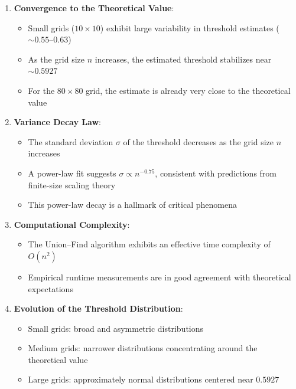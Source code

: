 \documentclass[11pt]{article}
\providecommand{\tightlist}{%
      \setlength{\itemsep}{0pt}\setlength{\parskip}{0pt}}
\begin{document}
\begin{enumerate}
\def\labelenumi{\arabic{enumi}.}
\item
  \textbf{Convergence to the Theoretical Value}:

  \begin{itemize}
  \tightlist
  \item
    Small grids (\(10 \times 10\)) exhibit large variability in
    threshold estimates (\(\sim 0.55\text{--}0.63\))
  \item
    As the grid size \(n\) increases, the estimated threshold stabilizes
    near \(\sim 0.5927\)
  \item
    For the \(80 \times 80\) grid, the estimate is already very close to
    the theoretical value
  \end{itemize}
\item
  \textbf{Variance Decay Law}:

  \begin{itemize}
  \tightlist
  \item
    The standard deviation \(\sigma\) of the threshold decreases as the
    grid size \(n\) increases
  \item
    A power-law fit suggests \(\sigma \propto n^{-0.75}\), consistent
    with predictions from finite-size scaling theory
  \item
    This power-law decay is a hallmark of critical phenomena
  \end{itemize}
\item
  \textbf{Computational Complexity}:

  \begin{itemize}
  \tightlist
  \item
    The Union--Find algorithm exhibits an effective time complexity of
    \(O(n^{2})\)
  \item
    Empirical runtime measurements are in good agreement with
    theoretical expectations
  \end{itemize}
\item
  \textbf{Evolution of the Threshold Distribution}:

  \begin{itemize}
  \tightlist
  \item
    Small grids: broad and asymmetric distributions
  \item
    Medium grids: narrower distributions concentrating around the
    theoretical value
  \item
    Large grids: approximately normal distributions centered near
    \(0.5927\)
  \end{itemize}
\end{enumerate}
\end{document}
